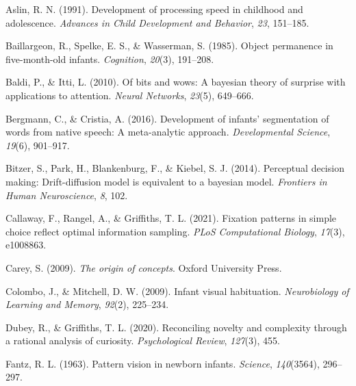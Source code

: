 \documentclass[10pt, letterpaper]{article}
\newenvironment{CSLReferences}%
  {}%
  {\par}
\begin{document}
\hypertarget{refs}{}
\begin{CSLReferences}
\leavevmode{}%
Aslin, R. N. (1991). Development of processing speed in childhood and
adolescence. \emph{Advances in Child Development and Behavior},
\emph{23}, 151--185.

\leavevmode{}%
Baillargeon, R., Spelke, E. S., \& Wasserman, S. (1985). Object
permanence in five-month-old infants. \emph{Cognition}, \emph{20}(3),
191--208.

\leavevmode{}%
Baldi, P., \& Itti, L. (2010). Of bits and wows: A bayesian theory of
surprise with applications to attention. \emph{Neural Networks},
\emph{23}(5), 649--666.

\leavevmode{}%
Bergmann, C., \& Cristia, A. (2016). Development of infants'
segmentation of words from native speech: A meta-analytic approach.
\emph{Developmental Science}, \emph{19}(6), 901--917.

\leavevmode{}%
Bitzer, S., Park, H., Blankenburg, F., \& Kiebel, S. J. (2014).
Perceptual decision making: Drift-diffusion model is equivalent to a
bayesian model. \emph{Frontiers in Human Neuroscience}, \emph{8}, 102.

\leavevmode{}%
Callaway, F., Rangel, A., \& Griffiths, T. L. (2021). Fixation patterns
in simple choice reflect optimal information sampling. \emph{PLoS
Computational Biology}, \emph{17}(3), e1008863.

\leavevmode{}%
Carey, S. (2009). \emph{The origin of concepts}. Oxford University
Press.

\leavevmode{}%
Colombo, J., \& Mitchell, D. W. (2009). Infant visual habituation.
\emph{Neurobiology of Learning and Memory}, \emph{92}(2), 225--234.

\leavevmode{}%
Dubey, R., \& Griffiths, T. L. (2020). Reconciling novelty and
complexity through a rational analysis of curiosity. \emph{Psychological
Review}, \emph{127}(3), 455.

\leavevmode{}%
Fantz, R. L. (1963). Pattern vision in newborn infants. \emph{Science},
\emph{140}(3564), 296--297.


\end{CSLReferences}
\end{document}
